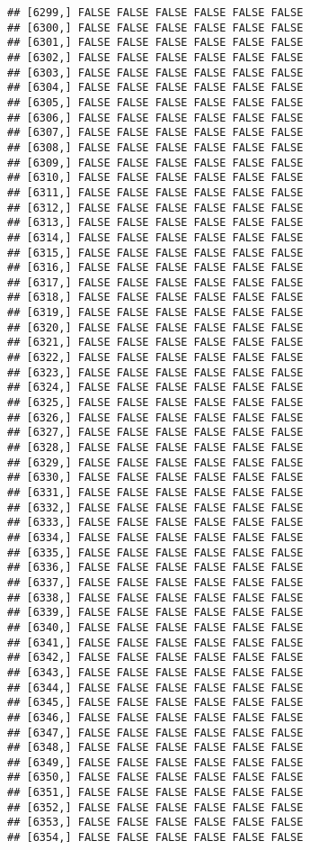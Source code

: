 \documentclass[
]{article}
\begin{document}
\begin{verbatim}
## [6299,] FALSE FALSE FALSE FALSE FALSE FALSE
## [6300,] FALSE FALSE FALSE FALSE FALSE FALSE
## [6301,] FALSE FALSE FALSE FALSE FALSE FALSE
## [6302,] FALSE FALSE FALSE FALSE FALSE FALSE
## [6303,] FALSE FALSE FALSE FALSE FALSE FALSE
## [6304,] FALSE FALSE FALSE FALSE FALSE FALSE
## [6305,] FALSE FALSE FALSE FALSE FALSE FALSE
## [6306,] FALSE FALSE FALSE FALSE FALSE FALSE
## [6307,] FALSE FALSE FALSE FALSE FALSE FALSE
## [6308,] FALSE FALSE FALSE FALSE FALSE FALSE
## [6309,] FALSE FALSE FALSE FALSE FALSE FALSE
## [6310,] FALSE FALSE FALSE FALSE FALSE FALSE
## [6311,] FALSE FALSE FALSE FALSE FALSE FALSE
## [6312,] FALSE FALSE FALSE FALSE FALSE FALSE
## [6313,] FALSE FALSE FALSE FALSE FALSE FALSE
## [6314,] FALSE FALSE FALSE FALSE FALSE FALSE
## [6315,] FALSE FALSE FALSE FALSE FALSE FALSE
## [6316,] FALSE FALSE FALSE FALSE FALSE FALSE
## [6317,] FALSE FALSE FALSE FALSE FALSE FALSE
## [6318,] FALSE FALSE FALSE FALSE FALSE FALSE
## [6319,] FALSE FALSE FALSE FALSE FALSE FALSE
## [6320,] FALSE FALSE FALSE FALSE FALSE FALSE
## [6321,] FALSE FALSE FALSE FALSE FALSE FALSE
## [6322,] FALSE FALSE FALSE FALSE FALSE FALSE
## [6323,] FALSE FALSE FALSE FALSE FALSE FALSE
## [6324,] FALSE FALSE FALSE FALSE FALSE FALSE
## [6325,] FALSE FALSE FALSE FALSE FALSE FALSE
## [6326,] FALSE FALSE FALSE FALSE FALSE FALSE
## [6327,] FALSE FALSE FALSE FALSE FALSE FALSE
## [6328,] FALSE FALSE FALSE FALSE FALSE FALSE
## [6329,] FALSE FALSE FALSE FALSE FALSE FALSE
## [6330,] FALSE FALSE FALSE FALSE FALSE FALSE
## [6331,] FALSE FALSE FALSE FALSE FALSE FALSE
## [6332,] FALSE FALSE FALSE FALSE FALSE FALSE
## [6333,] FALSE FALSE FALSE FALSE FALSE FALSE
## [6334,] FALSE FALSE FALSE FALSE FALSE FALSE
## [6335,] FALSE FALSE FALSE FALSE FALSE FALSE
## [6336,] FALSE FALSE FALSE FALSE FALSE FALSE
## [6337,] FALSE FALSE FALSE FALSE FALSE FALSE
## [6338,] FALSE FALSE FALSE FALSE FALSE FALSE
## [6339,] FALSE FALSE FALSE FALSE FALSE FALSE
## [6340,] FALSE FALSE FALSE FALSE FALSE FALSE
## [6341,] FALSE FALSE FALSE FALSE FALSE FALSE
## [6342,] FALSE FALSE FALSE FALSE FALSE FALSE
## [6343,] FALSE FALSE FALSE FALSE FALSE FALSE
## [6344,] FALSE FALSE FALSE FALSE FALSE FALSE
## [6345,] FALSE FALSE FALSE FALSE FALSE FALSE
## [6346,] FALSE FALSE FALSE FALSE FALSE FALSE
## [6347,] FALSE FALSE FALSE FALSE FALSE FALSE
## [6348,] FALSE FALSE FALSE FALSE FALSE FALSE
## [6349,] FALSE FALSE FALSE FALSE FALSE FALSE
## [6350,] FALSE FALSE FALSE FALSE FALSE FALSE
## [6351,] FALSE FALSE FALSE FALSE FALSE FALSE
## [6352,] FALSE FALSE FALSE FALSE FALSE FALSE
## [6353,] FALSE FALSE FALSE FALSE FALSE FALSE
## [6354,] FALSE FALSE FALSE FALSE FALSE FALSE

\end{verbatim}
\end{document}
